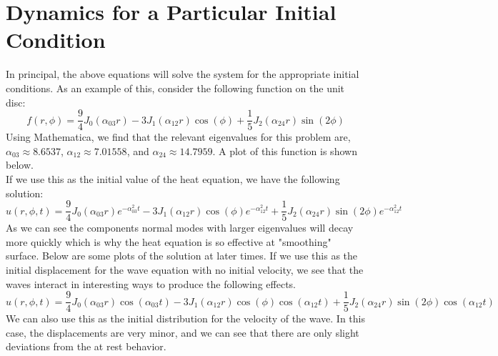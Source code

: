 \documentclass{article}
\begin{document}
\section{Dynamics for a Particular Initial Condition}
In principal, the above equations will solve the system for the appropriate initial conditions. As an example of this, consider the following function on the unit disc:
\begin{equation}
  f(r,\phi)=\frac{9}{4}J_0(\alpha_{03}r)-3 J_1(\alpha_{12}r)\cos(\phi)+\frac{1}{5} J_2(\alpha_{24}r)\sin(2\phi)
\end{equation}
Using Mathematica, we find that the relevant eigenvalues for this problem are, $\alpha_{03}\approx8.6537$, $\alpha_{12}\approx 7.01558$, and $\alpha_{24}\approx 14.7959$. A plot of this function is shown below.\\
If we use this as the initial value of the heat equation, we have the following solution:
\begin{equation}
  u(r,\phi,t)=\frac{9}{4}J_0(\alpha_{03}r)e^{-\alpha_{03}^2 t}-3 J_1(\alpha_{12}r)\cos(\phi)e^{-\alpha_{12}^2 t}+\frac{1}{5} J_2(\alpha_{24}r)\sin(2\phi)e^{-\alpha_{12}^2 t}
\end{equation}
As we can see the components normal modes with larger eigenvalues will decay more quickly which is why the heat equation is so effective at "smoothing" surface. Below are some plots of the solution at later times.
If we use this as the initial displacement for the wave equation with no initial velocity, we see that the waves interact in interesting ways to produce the following effects.
\begin{equation}
    u(r,\phi,t)=\frac{9}{4}J_0(\alpha_{03}r)\cos(\alpha_{03} t)-3 J_1(\alpha_{12}r)\cos(\phi)\cos(\alpha_{12} t)+\frac{1}{5} J_2(\alpha_{24}r)\sin(2\phi)\cos(\alpha_{12} t)
\end{equation}
We can also use this as the initial distribution for the velocity of the wave. In this case, the displacements are very minor, and we can see that there are only slight deviations from the at rest behavior.
\end{document}
